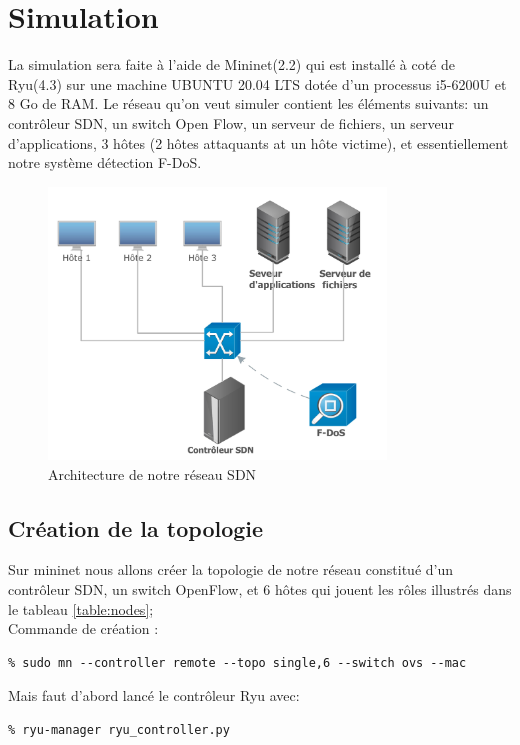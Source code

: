 \section{Simulation}
La simulation sera faite à l'aide de Mininet(2.2) qui est installé à coté de Ryu(4.3) sur une machine UBUNTU 20.04 LTS dotée d'un processus i5-6200U et 8 Go de RAM. Le réseau qu'on veut simuler contient les éléments suivants: un contrôleur SDN, un switch Open Flow, un serveur de fichiers, un serveur d'applications, 3 hôtes (2 hôtes attaquants at un hôte victime), et essentiellement notre système détection F-DoS.
\begin{figure}[h]
\centering
\includegraphics[width=0.8\textwidth]{Figures/simulation}
\decoRule
\caption{Architecture de notre réseau SDN}
\label{fig:architecture}
\end{figure} 

\subsection{Création de la topologie}
Sur mininet nous allons créer la topologie de notre réseau constitué d'un contrôleur SDN, un switch OpenFlow, et 6 hôtes qui jouent les rôles illustrés dans le tableau \ref{table:nodes};\\

\noindent Commande de création :
\begin{verbatim}
% sudo mn --controller remote --topo single,6 --switch ovs --mac
\end{verbatim}
Mais faut d'abord lancé le contrôleur Ryu avec:
\begin{verbatim}
% ryu-manager ryu_controller.py 
\end{verbatim}

